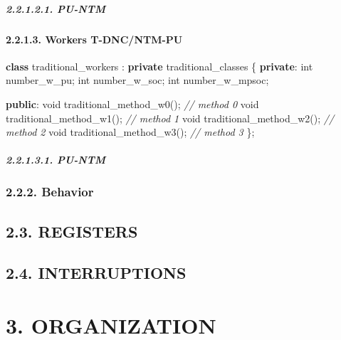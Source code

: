 \documentclass[
]{article}
\newenvironment{Shaded}{}{}
\newcommand{\CommentTok}[1]{\textcolor[rgb]{0.38,0.63,0.69}{\textit{#1}}}
\newcommand{\DataTypeTok}[1]{\textcolor[rgb]{0.56,0.13,0.00}{#1}}
\newcommand{\KeywordTok}[1]{\textcolor[rgb]{0.00,0.44,0.13}{\textbf{#1}}}
\newcommand{\NormalTok}[1]{#1}
\begin{document}
\hypertarget{pu-ntm-1}{%
\subparagraph{2.2.1.2.1. PU-NTM}\label{pu-ntm-1}}

\hypertarget{workers-t-dncntm-pu}{%
\paragraph{2.2.1.3. Workers T-DNC/NTM-PU}\label{workers-t-dncntm-pu}}

\begin{Shaded}
\begin{Highlighting}[]
\KeywordTok{class}\NormalTok{ traditional\_workers : }\KeywordTok{private}\NormalTok{ traditional\_classes \{}
   \KeywordTok{private}\NormalTok{:}
      \DataTypeTok{int}\NormalTok{ number\_w\_pu;}
      \DataTypeTok{int}\NormalTok{ number\_w\_soc;}
      \DataTypeTok{int}\NormalTok{ number\_w\_mpsoc;}

   \KeywordTok{public}\NormalTok{:}
      \DataTypeTok{void}\NormalTok{ traditional\_method\_w0();  }\CommentTok{// method 0}
      \DataTypeTok{void}\NormalTok{ traditional\_method\_w1();  }\CommentTok{// method 1}
      \DataTypeTok{void}\NormalTok{ traditional\_method\_w2();  }\CommentTok{// method 2}
      \DataTypeTok{void}\NormalTok{ traditional\_method\_w3();  }\CommentTok{// method 3}
\NormalTok{\};}
\end{Highlighting}
\end{Shaded}

\hypertarget{pu-ntm-2}{%
\subparagraph{2.2.1.3.1. PU-NTM}\label{pu-ntm-2}}

\hypertarget{behavior}{%
\subsubsection{2.2.2. Behavior}\label{behavior}}

\hypertarget{registers}{%
\subsection{2.3. REGISTERS}\label{registers}}

\hypertarget{interruptions}{%
\subsection{2.4. INTERRUPTIONS}\label{interruptions}}

\hypertarget{organization}{%
\section{3. ORGANIZATION}\label{organization}}
\end{document}
